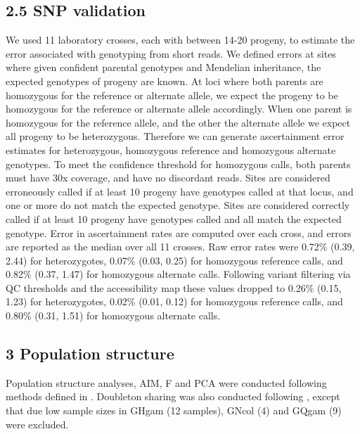 \documentclass[a4paper,11pt,abstracton,hidelinks]{scrartcl}
\begin{document}
\subsection*{2.5 SNP validation}

We used 11 laboratory crosses, each with between 14-20 progeny, to estimate the error associated with genotyping from short reads. 
%
We defined errors at sites where given confident parental genotypes and Mendelian inheritance, the expected genotypes of progeny are known. 
%
At loci where both parents are homozygous for the reference or alternate allele, we expect the progeny to be homozygous for the reference or alternate allele accordingly.
%
When one parent is homozygous for the reference allele, and the other the alternate allele we expect all progeny to be heterozygous. 
%
Therefore we can generate ascertainment error estimates for heterozygous, homozygous reference and homozygous alternate genotypes.
%
To meet the confidence threshold for homozygous calls, both parents must have 30x coverage, and have no discordant reads.
%
Sites are considered erroneously called if at least 10 progeny have genotypes called at that locus, and one or more do not match the expected genotype. 
%
Sites are considered correctly called if at least 10 progeny have genotypes called and all match the expected genotype. 
%
Error in ascertainment rates are computed over each cross, and errors are reported as the median over all 11 crosses. 
%
%
Raw error rates were 0.72\% (0.39, 2.44) for heterozygotes, 0.07\% (0.03, 0.25) for homozygous reference calls, and 0.82\% (0.37, 1.47) for homozygous alternate calls. 
%
Following variant filtering via QC thresholds and the accessibility map these values dropped to 0.26\% (0.15, 1.23) for heterozygotes, 0.02\% (0.01, 0.12) for homozygous reference calls, and 0.80\% (0.31, 1.51) for homozygous alternate calls. 


\subsection*{3 Population structure}

%
Population structure analyses, AIM, F and PCA were conducted following methods defined in \cite{Ag1000gConsortium2017}.
%
Doubleton sharing was also conducted following \cite{Ag1000gConsortium2017}, except that due low sample sizes in GHgam (12 samples), GNcol (4) and GQgam (9) were excluded.  
\end{document}
